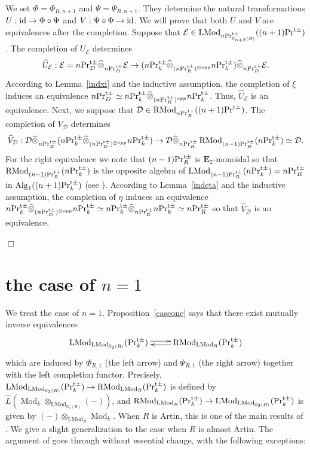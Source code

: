 \documentclass[leqno,12pt]{amsart}
\theoremstyle{plain}
\theoremstyle{definition}
\newcommand{\DD}{\mathbb{D}}
\newcommand{\EE}{\mathcal{E}}
\newcommand{\DDD}{\mathcal{D}}
\newcommand{\PRTT}{\textup{Pr}^{\textup{t}+}}
\newcommand{\PRTTT}{\textup{Pr}^{\textup{t}\pm}}
\newcommand{\Mod}{\operatorname{Mod}}
\newcommand{\Alg}{\operatorname{Alg}}
\newcommand{\etwo}{\mathbf{E}_2}
\newcommand{\LMod}{\operatorname{LMod}}
\newcommand{\RMod}{\operatorname{RMod}}
\newcommand{\QED}{{\unskip\nobreak\hfil\penalty50\quad\null\nobreak\hfil
{$\Box$}\parfillskip0pt\finalhyphendemerits0\par\medskip}}
\begin{document}
We set $\Phi=\Phi_{R,n+1}$ and $\Psi=\Psi_{R,n+1}$.
They determine the natural transformations $U:\textup{id}\to \Phi\circ \Psi$ and $V:\Psi \circ \Phi\to \textup{id}$.
We will prove that both $U$ and $V$ are equivalences after the completion.
Suppose that $\EE\in \LMod_{n\PRTTT_{\DD_{n+2}(R)}}((n+1)\PRTTT)$.
The completion of $U_{\EE}$ determines
\[
\widehat{U}_{\EE}:\EE=n\PRTTT_D\widehat{\otimes}_{n\PRTTT_{D}} \EE\to  (n\PRTTT_k\widehat{\otimes}_{(n\PRTTT_R)^{\otimes opp}}n\PRTTT_k)\widehat{\otimes}_{n\PRTTT_{D}}\EE.
\]
According to Lemma~\ref{indxi} and the inductive assumption,
the completion of $\xi$ induces an equivalence $n\PRTTT_{D}\simeq n\PRTTT_k\widehat{\otimes}_{(n\PRTTT_R)^{opp}}n\PRTTT_k$.
Thus, $\widehat{U}_{\EE}$ is an equivalence.
Next, we
suppose that $\DDD\in \RMod_{n\PRTT_{R}}((n+1)\PRTTT)$.
The completion of $V_{\DDD}$ determines
\[
\widehat{V}_{\DDD}:\DDD\widehat{\otimes}_{n\PRTTT_{R}}(n\PRTTT_k\widehat{\otimes}_{(n\PRTTT_{D})^{\otimes opp}}n\PRTTT_k)\to \DDD\widehat{\otimes}_{n\PRTTT_{R}}\RMod_{(n-1)\PRTTT_R}(n\PRTTT_k)\simeq \DDD.
\]
For the right equivalence we note that $(n-1)\PRTTT_R$ is $\etwo$-monoidal so that
$\RMod_{(n-1)\PRTTT_R}(n\PRTTT_k)$ is the opposite algebra of $\LMod_{(n-1)\PRTTT_R}(n\PRTTT_k)=n\PRTTT_R$ in $\Alg_1((n+1)\PRTTT_k)$ (see \cite[Proposition 2.15]{IH}).
According to Lemma~\ref{indeta} and the inductive assumption,
the completion of $\eta$ induces an equivalence $n\PRTTT_k\widehat{\otimes}_{(n\PRTTT_{D})^{\otimes opp}}n\PRTTT_k\simeq n\PRTTT_k\widehat{\otimes}_{n\PRTTT_{D}}n\PRTTT_k\simeq n\PRTTT_R$ so that $\widehat{V}_{\DDD}$ is an equivalence.
\QED





\section{the case of $n=1$}
\label{n1sec}

We treat the case of $n=1$.
Proposition~\ref{caseone} says that there exist mutually inverse equivalences
\[
\xymatrix{
\LMod_{\LMod_{\DD_{2}(R)}}(\PRTTT_k) \ar@<0.5ex>[r]  &  \RMod_{\LMod_R}(\PRTTT_k)   \ar@<0.5ex>[l]  
}
\]
which are induced by $\Phi_{R,1}$ (the left arrow) and $\Psi_{R,1}$ (the right arrow) 
together with the left completion functor.
Precisely, $\LMod_{\LMod_{\DD_{2}(R)}}(\PRTTT_k) \to  \RMod_{\LMod_R}(\PRTTT_k)$
is defined by $\widehat{L}(\Mod_k\otimes_{\LMod_{\DD_2(R)}}(-))$,
and $\RMod_{\LMod_R}(\PRTTT_k)\to \LMod_{\LMod_{\DD_{2}(R)}}(\PRTTT_k)$
is given by $(-)\otimes_{\LMod_{R}}\Mod_k$.
When $R$ is Artin, this is one of the main results of \cite{IH}. 
We give a slight generalization to the case when $R$ is almost Artin.
The argument of \cite[Section 3]{IH} goes through without essential
change, with the following exceptions:
\end{document}
